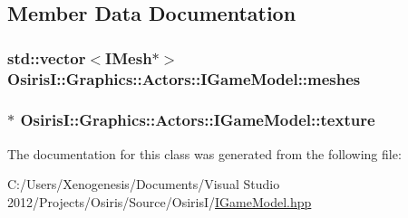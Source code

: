 \subsection{Member Data Documentation}
\hypertarget{class_osiris_i_1_1_graphics_1_1_actors_1_1_i_game_model_a97095f64ea0a21032f97ff12a830665f}{
\subsubsection[{meshes}]{\setlength{\rightskip}{0pt plus 5cm}std\-::vector$<${\bf I\-Mesh}$\ast$$>$ Osiris\-I\-::\-Graphics\-::\-Actors\-::\-I\-Game\-Model\-::meshes\hspace{0.3cm}{\ttfamily [protected]}}}\label{class_osiris_i_1_1_graphics_1_1_actors_1_1_i_game_model_a97095f64ea0a21032f97ff12a830665f}
\hypertarget{class_osiris_i_1_1_graphics_1_1_actors_1_1_i_game_model_a2f34baba7ff1843f4457c2955e61c76e}{
\subsubsection[{texture}]{$\ast$ Osiris\-I\-::\-Graphics\-::\-Actors\-::\-I\-Game\-Model\-::texture\hspace{0.3cm}{\ttfamily [protected]}}}\label{class_osiris_i_1_1_graphics_1_1_actors_1_1_i_game_model_a2f34baba7ff1843f4457c2955e61c76e}


The documentation for this class was generated from the following file\-:\begin{DoxyCompactItemize}
\item 
C\-:/\-Users/\-Xenogenesis/\-Documents/\-Visual Studio 2012/\-Projects/\-Osiris/\-Source/\-Osiris\-I/\hyperlink{_i_game_model_8hpp}{I\-Game\-Model.\-hpp}\end{DoxyCompactItemize}
